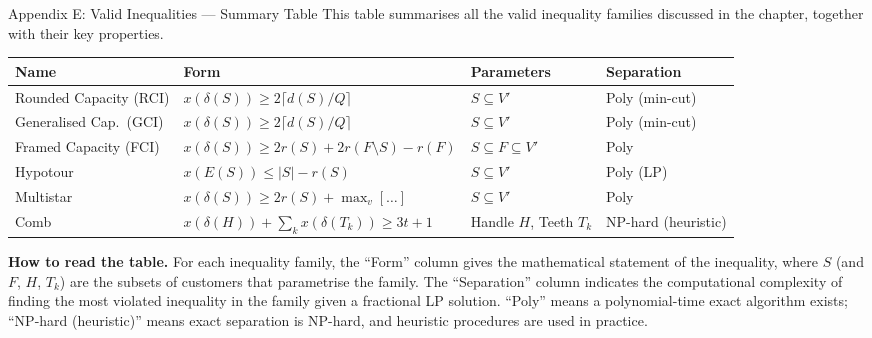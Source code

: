 \documentclass[aspectratio=169,10pt]{beamer}
\begin{document}
\begin{frame}[allowframebreaks]{Appendix E: Valid Inequalities --- Summary Table}
  This table summarises all the valid inequality families discussed in
  the chapter, together with their key properties.

  \begin{center}
  \small
  \begin{tabular}{p{2.8cm}p{5.5cm}p{2.8cm}l}
    \toprule
    \textbf{Name} & \textbf{Form} & \textbf{Parameters} & \textbf{Separation} \\
    \midrule
    Rounded Capacity (RCI)
    & $x(\delta(S)) \geq 2\lceil d(S)/Q \rceil$
    & $S \subseteq V'$
    & Poly (min-cut) \\[6pt]
    Generalised Cap.\ (GCI)
    & $x(\delta(S)) \geq 2\lceil d(S)/Q \rceil$
    & $S \subseteq V'$
    & Poly (min-cut) \\[6pt]
    Framed Capacity (FCI)
    & $x(\delta(S)) \geq 2r(S)+2r(F\setminus S)-r(F)$
    & $S \subseteq F \subseteq V'$
    & Poly \\[6pt]
    Hypotour
    & $x(E(S)) \leq |S| - r(S)$
    & $S \subseteq V'$
    & Poly (LP) \\[6pt]
    Multistar
    & $x(\delta(S)) \geq 2r(S) + \max_v[\ldots]$
    & $S \subseteq V'$
    & Poly \\[6pt]
    Comb
    & $x(\delta(H))+\sum_k x(\delta(T_k)) \geq 3t+1$
    & Handle $H$, Teeth $T_k$
    & NP-hard (heuristic) \\
    \bottomrule
  \end{tabular}
  \end{center}

  \bigskip
  \textbf{How to read the table.}
  For each inequality family, the ``Form'' column gives the mathematical
  statement of the inequality, where $S$ (and $F$, $H$, $T_k$) are the
  subsets of customers that parametrise the family. The ``Separation''
  column indicates the computational complexity of finding the most violated
  inequality in the family given a fractional LP solution.
  ``Poly'' means a polynomial-time exact algorithm exists; ``NP-hard
  (heuristic)'' means exact separation is NP-hard, and heuristic procedures
  are used in practice.
\end{frame}
\end{document}
